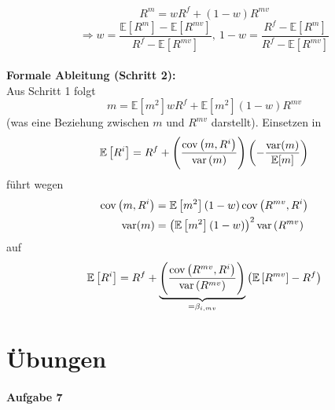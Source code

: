 \documentclass[12pt]{extreport} %
\theoremstyle{named}
\theoremstyle{nnamed}
\theoremstyle{itshape}
\theoremstyle{normal}
\begin{document}
$$ R^m = w R^f + (1- w) R^{mv} $$
$$ \Rightarrow w = \frac{\mathbb{E} \left[ R^m \right] - \mathbb{E} \left[ R^{mv} \right]}{R^f - \mathbb{E} \left[ R^{mv} \right]}, ~ 1-w = \frac{R^f - \mathbb{E} \left[ R^{m} \right]}{R^f - \mathbb{E} \left[ R^{mv} \right]} $$
~\\
\textbf{Formale Ableitung (Schritt 2):} ~\\
Aus Schritt 1 folgt 
	$$ m = \mathbb{E} \left[ m^2 \right] w R^f + \mathbb{E} \left[ m^2 \right] \left( 1 - w \right) R^{mv} $$
(was eine Beziehung zwischen $m$ und $R^{mv}$ darstellt). Einsetzen in
	$$ \mathbb{E} \left[ R^i \right] = R^f + \left( \frac{\operatorname{cov} \left(m, R^i \right)}{\operatorname{var} \left( m \right)} \right) \left( - \frac{\operatorname{var}(m)}{\mathbb{E} [m]} \right) $$
führt wegen 
\begin{align*}
	\operatorname{cov} \left( m, R^i \right) & = \mathbb{E} \left[ m^2 \right] (1 - w) \operatorname{cov} \left( R^{mv}, R^i \right) \\
	\operatorname{var} (m) & = \left( \mathbb{E} \left[ m^2 \right] \left(1 - w \right) \right)^2 \operatorname{var} \left( R^{mv} \right)
\end{align*}
auf
$$ \mathbb{E} \left[ R^i \right] = R^f + \underbrace{ \left( \frac{\operatorname{cov} \left( R^{mv}, R^i \right)}{ \operatorname{var} \left( R^{mv} \right)} \right)}_{= \beta_{i,mv}} \left( \mathbb{E}\left[ R^{mv} \right] - R^f \right) $$



\chapter{Übungen}

\subsubsection*{Aufgabe 7}
\end{document}
